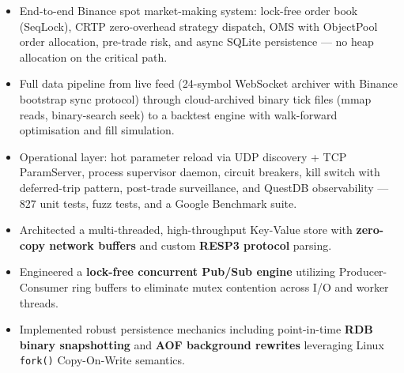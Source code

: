 \documentclass[a4paper,12pt]{memoir} %
\begin{document}
\begin{minipage}{\linewidth}

{\small
{}
{
\begin{itemize}
\item End-to-end Binance spot market-making system: lock-free order book (SeqLock), CRTP zero-overhead strategy dispatch, OMS with ObjectPool order allocation, pre-trade risk, and async SQLite persistence — no heap allocation on the critical path.
\item Full data pipeline from live feed (24-symbol WebSocket archiver with Binance bootstrap sync protocol) through cloud-archived binary tick files (mmap reads, binary-search seek) to a backtest engine with walk-forward optimisation and fill simulation.
\item Operational layer: hot parameter reload via UDP discovery + TCP ParamServer, process supervisor daemon, circuit breakers, kill switch with deferred-trip pattern, post-trade surveillance, and QuestDB observability — 827 unit tests, fuzz tests, and a Google Benchmark suite.
\end{itemize}
}
}
\end{minipage}

\begin{minipage}{\linewidth}
{\small
{}
{
\begin{itemize}
\item Architected a multi-threaded, high-throughput Key-Value store with \textbf{zero-copy network buffers} and custom \textbf{RESP3 protocol} parsing.
\item Engineered a \textbf{lock-free concurrent Pub/Sub engine} utilizing Producer-Consumer ring buffers to eliminate mutex contention across I/O and worker threads.
\item Implemented robust persistence mechanics including point-in-time \textbf{RDB binary snapshotting} and \textbf{AOF background rewrites} leveraging Linux \texttt{fork()} Copy-On-Write semantics.
\end{itemize}
}
}
\end{minipage}
\end{document}
